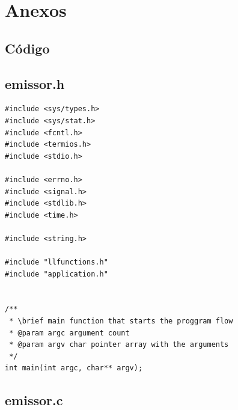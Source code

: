 \documentclass{article}
\begin{document}
\section{Anexos}

\subsection{Código}

\subsection{emissor.h}
\begin{lstlisting}[style=CStyle]
#include <sys/types.h>
#include <sys/stat.h>
#include <fcntl.h>
#include <termios.h>
#include <stdio.h>

#include <errno.h>
#include <signal.h>
#include <stdlib.h>
#include <time.h>

#include <string.h>

#include "llfunctions.h"
#include "application.h"


/**
 * \brief main function that starts the proggram flow
 * @param argc argument count
 * @param argv char pointer array with the arguments
 */
int main(int argc, char** argv);

\end{lstlisting}

\subsection{emissor.c}
\end{document}
